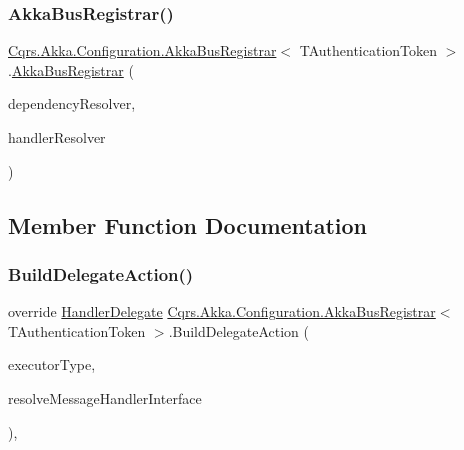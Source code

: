 \subsubsection{\texorpdfstring{Akka\+Bus\+Registrar()}{AkkaBusRegistrar()}}
{\footnotesize\ttfamily \hyperlink{classCqrs_1_1Akka_1_1Configuration_1_1AkkaBusRegistrar}{Cqrs.\+Akka.\+Configuration.\+Akka\+Bus\+Registrar}$<$ T\+Authentication\+Token $>$.\hyperlink{classCqrs_1_1Akka_1_1Configuration_1_1AkkaBusRegistrar}{Akka\+Bus\+Registrar} (\begin{DoxyParamCaption}\item[{\hyperlink{interfaceCqrs_1_1Configuration_1_1IDependencyResolver}{I\+Dependency\+Resolver}}]{dependency\+Resolver,  }\item[{\hyperlink{interfaceCqrs_1_1Akka_1_1Configuration_1_1IHandlerResolver}{I\+Handler\+Resolver}}]{handler\+Resolver }\end{DoxyParamCaption})}



\subsection{Member Function Documentation}
\mbox{\label{classCqrs_1_1Akka_1_1Configuration_1_1AkkaBusRegistrar_ad7e3e5d332d5b4d781375a28f23bdb19}} 
\subsubsection{\texorpdfstring{Build\+Delegate\+Action()}{BuildDelegateAction()}}
{\footnotesize\ttfamily override \hyperlink{classCqrs_1_1Configuration_1_1HandlerDelegate}{Handler\+Delegate} \hyperlink{classCqrs_1_1Akka_1_1Configuration_1_1AkkaBusRegistrar}{Cqrs.\+Akka.\+Configuration.\+Akka\+Bus\+Registrar}$<$ T\+Authentication\+Token $>$.Build\+Delegate\+Action (\begin{DoxyParamCaption}\item[{Type}]{executor\+Type,  }\item[{Func$<$ Type, I\+Enumerable$<$ Type $>$$>$}]{resolve\+Message\+Handler\+Interface }\end{DoxyParamCaption})\hspace{0.3cm}{\ttfamily [protected]}, {\ttfamily [virtual]}}



